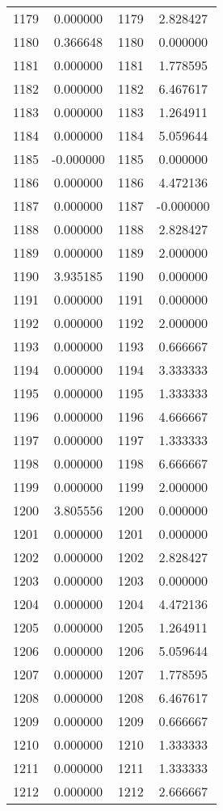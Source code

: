 \documentclass[12pt]{article}
\begin{document}
\begin{longtable}{@{}cccc@{}}
1179 & 0.000000 & 1179 & 2.828427 \\
1180 & 0.366648 & 1180 & 0.000000 \\
1181 & 0.000000 & 1181 & 1.778595 \\
1182 & 0.000000 & 1182 & 6.467617 \\
1183 & 0.000000 & 1183 & 1.264911 \\
1184 & 0.000000 & 1184 & 5.059644 \\
1185 & -0.000000 & 1185 & 0.000000 \\
1186 & 0.000000 & 1186 & 4.472136 \\
1187 & 0.000000 & 1187 & -0.000000 \\
1188 & 0.000000 & 1188 & 2.828427 \\
1189 & 0.000000 & 1189 & 2.000000 \\
1190 & 3.935185 & 1190 & 0.000000 \\
1191 & 0.000000 & 1191 & 0.000000 \\
1192 & 0.000000 & 1192 & 2.000000 \\
1193 & 0.000000 & 1193 & 0.666667 \\
1194 & 0.000000 & 1194 & 3.333333 \\
1195 & 0.000000 & 1195 & 1.333333 \\
1196 & 0.000000 & 1196 & 4.666667 \\
1197 & 0.000000 & 1197 & 1.333333 \\
1198 & 0.000000 & 1198 & 6.666667 \\
1199 & 0.000000 & 1199 & 2.000000 \\
1200 & 3.805556 & 1200 & 0.000000 \\
1201 & 0.000000 & 1201 & 0.000000 \\
1202 & 0.000000 & 1202 & 2.828427 \\
1203 & 0.000000 & 1203 & 0.000000 \\
1204 & 0.000000 & 1204 & 4.472136 \\
1205 & 0.000000 & 1205 & 1.264911 \\
1206 & 0.000000 & 1206 & 5.059644 \\
1207 & 0.000000 & 1207 & 1.778595 \\
1208 & 0.000000 & 1208 & 6.467617 \\
1209 & 0.000000 & 1209 & 0.666667 \\
1210 & 0.000000 & 1210 & 1.333333 \\
1211 & 0.000000 & 1211 & 1.333333 \\
1212 & 0.000000 & 1212 & 2.666667 \\

\end{longtable}
\end{document}
